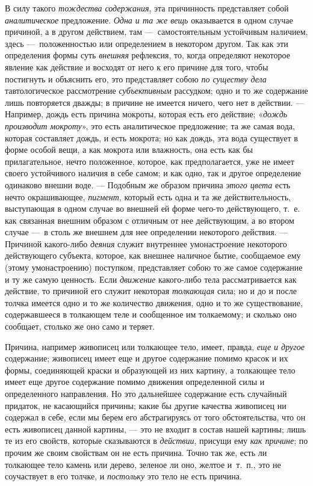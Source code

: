 В силу такого {\em тождества содержания}, эта
причинность представляет собой {\em аналитическое}
предложение. {\em Одна и та же вещь} оказывается в
одном случае причиной, а в другом действием, там —~самостоятельным
устойчивым наличием, здесь —~положенностью или определением в некотором
другом. Так как эти определения формы суть
{\em внешняя} рефлексия, то, когда определяют некоторое
явление как действие и восходят от него к его причине для того, чтобы
постигнуть и объяснить его, это представляет собою
{\em по существу дела} тавтологическое рассмотрение
{\em субъективным} рассудком; одно и то же содержание
лишь повторяется дважды; в причине не имеется ничего, чего нет в действии.
— Например, дождь есть причина мокроты, которая есть его действие;
«{\em дождь производит мокроту}», это есть
аналитическое предложение; та же самая вода, которая составляет дождь, и
есть мокрота; но как дождь, эта вода существует в форме особой вещи, а как
мокрота или влажность, она есть как бы прилагательное, нечто положенное,
которое, как предполагается, уже не имеет своего устойчивого наличия в себе
самом; и как одно, так и другое определение одинаково внешни воде. —
Подобным же образом причина {\em этого цвета} есть
нечто окрашивающее, {\em пигмент}, который есть одна и
та же действительность, выступающая в одном случае во внешней ей форме
чего-то действующего, т.~е. как связанная внешним образом с отличным от нее
действующим, а во втором случае —~в столь же внешнем для нее определении
некоторого действия. — Причиной какого-либо
{\em деяния} служит внутреннее умонастроение некоторого
действующего субъекта, которое, как внешнее наличное бытие, сообщаемое ему
(этому умонастроению) поступком, представляет собою то же самое содержание
и ту же самую ценность. Если {\em движение} какого-либо
тела рассматривается как действие, то причиной его служит некоторая
{\em толкающая} сила; но и до и после толчка имеется
одно и то же количество движения, одно и то же существование, содержавшееся
в толкающем теле и сообщенное им толкаемому; и сколько оно сообщает,
столько же оно само и теряет.

Причина, например живописец или толкающее тело, имеет, правда,
{\em еще и другое} содержание; живописец имеет еще и
другое содержание помимо красок и их формы, соединяющей краски и образующей
из них картину, а толкающее тело имеет еще другое содержание помимо
движения определенной силы и определенного направления. Но это дальнейшее
содержание есть случайный придаток, не касающийся причины; какие бы другие
качества живописец ни содержал в себе, если мы берем его абстрагируясь от
того обстоятельства, что он есть живописец данной картины, — это не входит
в состав нашей картины; лишь те из его свойств, которые сказываются в
{\em действии}, присущи ему
{\em как причине}; по прочим же своим свойствам он не
есть причина. Точно так же, есть ли толкающее тело камень или дерево,
зеленое ли оно, желтое и~т.~п., это не соучаствует в его толчке, и
{\em постольку} это тело не есть причина.

